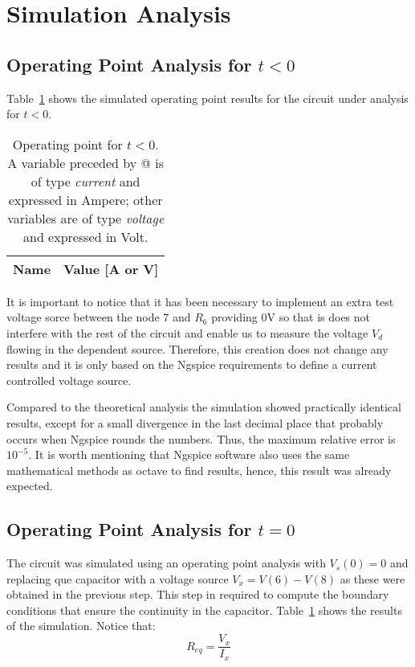 \section{Simulation Analysis }
\label{sec:simulation}

\subsection{Operating Point Analysis for $t<0$}

Table~\ref{tab:op} shows the simulated operating point results for the circuit under analysis for $t<0$.
\begin{table}[h]
  \centering
  \begin{tabular}{|l|r|}
    \hline    
    {\bf Name} & {\bf Value [A or V]} \\ \hline
    
  \end{tabular}
  \caption{Operating point for $t<0$. A variable preceded by @ is of type {\em current}
    and expressed in Ampere; other variables are of type {\it voltage} and expressed in
    Volt.}
  \label{tab:op}
\end{table}

It is important to notice that it has been necessary to implement an extra test voltage sorce  between the node 7 and $R_6$ providing 0V so that is does not interfere with the rest of the circuit and enable us to measure the voltage $V_d$ flowing in the dependent source. Therefore, this creation does not change any results and it is only based on the Ngspice requirements to define a current controlled voltage source.

Compared to the theoretical analysis the simulation showed practically identical results, except for a small divergence in the last decimal place that probably occurs when Ngspice rounds the numbers. Thus, the maximum relative error is $10^{-5}$. It is worth mentioning that Ngspice software also uses the same mathematical methods as octave to find results, hence, this result was already expected.


\subsection{Operating Point Analysis for $t=0$}

The circuit was simulated using an operating point analysis with $V_s(0)=0$ and replacing que capacitor with a voltage source $V_x=V(6)-V(8)$ as these were obtained in the previous step. This step in required to compute the boundary conditions that ensure the continuity in the capacitor. Table~\ref{tab:op} shows the results of the simulation. Notice that:  \begin{equation}
R_{eq}=\frac{V_{x}}{I_{x}}
\end{equation}

